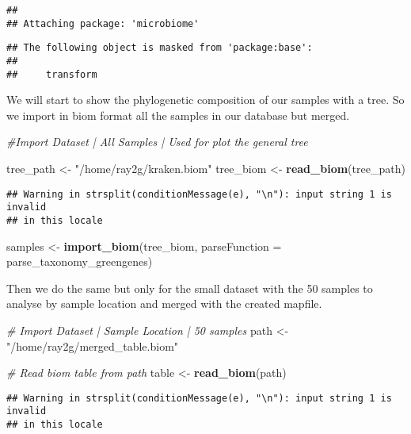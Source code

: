 \documentclass[]{article}
\newenvironment{Shaded}{\begin{snugshade}}{\end{snugshade}}
\newcommand{\CommentTok}[1]{\textcolor[rgb]{0.56,0.35,0.01}{\textit{#1}}}
\newcommand{\DataTypeTok}[1]{\textcolor[rgb]{0.13,0.29,0.53}{#1}}
\newcommand{\KeywordTok}[1]{\textcolor[rgb]{0.13,0.29,0.53}{\textbf{#1}}}
\newcommand{\NormalTok}[1]{#1}
\newcommand{\StringTok}[1]{\textcolor[rgb]{0.31,0.60,0.02}{#1}}
\begin{document}
\begin{verbatim}
## 
## Attaching package: 'microbiome'
\end{verbatim}

\begin{verbatim}
## The following object is masked from 'package:base':
## 
##     transform
\end{verbatim}

We will start to show the phylogenetic composition of our samples with a
tree. So we import in biom format all the samples in our database but
merged.

\begin{Shaded}
\begin{Highlighting}[]
\CommentTok{#Import Dataset | All Samples | Used for plot the general tree}

\NormalTok{tree_path <-}\StringTok{ "/home/ray2g/kraken.biom"}
\NormalTok{tree_biom <-}\StringTok{ }\KeywordTok{read_biom}\NormalTok{(tree_path)}
\end{Highlighting}
\end{Shaded}

\begin{verbatim}
## Warning in strsplit(conditionMessage(e), "\n"): input string 1 is invalid
## in this locale
\end{verbatim}

\begin{Shaded}
\begin{Highlighting}[]
\NormalTok{samples <-}\StringTok{ }\KeywordTok{import_biom}\NormalTok{(tree_biom, }\DataTypeTok{parseFunction =}\NormalTok{ parse_taxonomy_greengenes)}
\end{Highlighting}
\end{Shaded}

Then we do the same but only for the small dataset with the 50 samples
to analyse by sample location and merged with the created mapfile.

\begin{Shaded}
\begin{Highlighting}[]
\CommentTok{# Import Dataset | Sample Location | 50 samples}
\NormalTok{path <-}\StringTok{ "/home/ray2g/merged_table.biom"}

\CommentTok{# Read biom table from path}
\NormalTok{table <-}\StringTok{ }\KeywordTok{read_biom}\NormalTok{(path)}
\end{Highlighting}
\end{Shaded}

\begin{verbatim}
## Warning in strsplit(conditionMessage(e), "\n"): input string 1 is invalid
## in this locale
\end{verbatim}
\end{document}
